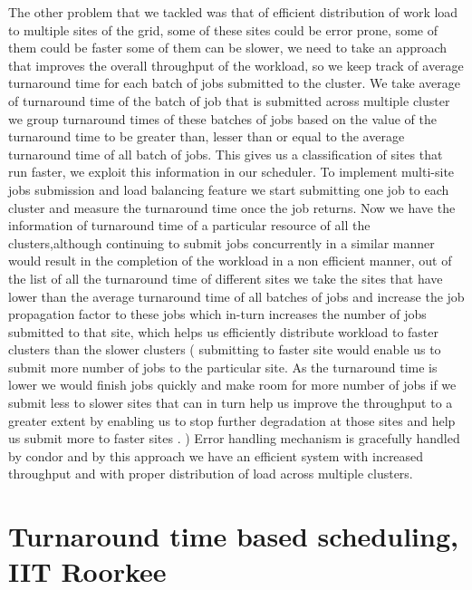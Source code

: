 \documentclass[ms,electronic,double]{nuthesis}
\begin{document}
    
The other problem that we tackled was that of efficient distribution of work load to multiple sites of the 
grid,
some of these sites could be error prone, some of them could be faster some of them can be slower, we need to
take an approach that improves the overall throughput of the workload, so we keep track of average turnaround
 time for each batch of jobs submitted to the cluster. We take average of turnaround time of the batch of job that is submitted 
 across multiple cluster we group turnaround times of these batches of jobs based on the value of the 
 turnaround time to be greater than, lesser than or equal to the average turnaround time of all batch of jobs.
 This gives us a classification of sites that run faster, we exploit this information in our scheduler. 
 To implement multi-site jobs submission and load balancing feature we start submitting one job to each cluster 
 and measure the turnaround time once the job returns. Now we have the information of turnaround time 
 of a particular resource of all the clusters,although continuing to submit jobs concurrently in a similar manner
  would result in the completion of
 the workload in a non efficient manner, out of the list of all the turnaround time of different sites we take the 
 sites
 that have lower than the average turnaround time of all batches of jobs and increase the job propagation 
 factor to these jobs which in-turn increases the number of jobs submitted to that site, which helps us efficiently distribute 
 workload to faster clusters than the slower clusters ( submitting to faster site would enable us to submit 
 more
  number of jobs to the particular site. As the turnaround time is lower we would finish jobs quickly and make room for more number 
  of jobs if we submit less to slower sites that can in turn help us improve the throughput to a greater extent by enabling us to stop
  further degradation at those sites and help us submit more to faster sites .
  ) 
  Error handling mechanism is gracefully handled by 
 condor and by this approach we have an efficient system with increased throughput and with proper distribution
  of load across multiple clusters.  
        
 
 
 
 



\section{Turnaround time based scheduling, IIT Roorkee}
\end{document}
